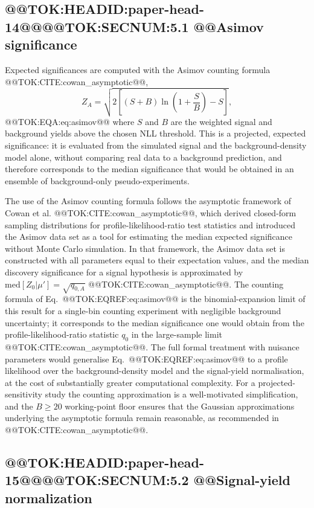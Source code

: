 \documentclass[11pt]{article}
\begin{document}
\subsection{@@TOK:HEADID:paper-head-14@@@@TOK:SECNUM:5.1 @@Asimov significance}

Expected significances are computed with the Asimov counting formula
@@TOK:CITE:cowan_asymptotic@@,
\begin{equation}
  Z_A = \sqrt{2\left[(S+B)\ln\left(1+\frac{S}{B}\right)-S\right]},
  
\end{equation}@@TOK:EQA:eq:asimov@@
where $S$ and $B$ are the weighted signal and background yields above the
chosen NLL threshold. This is a projected, expected significance: it is
evaluated from the simulated signal and the background-density model alone,
without comparing real data to a background prediction, and therefore
corresponds to the median significance that would be obtained in an
ensemble of background-only pseudo-experiments.

The use of the Asimov counting formula follows the asymptotic framework of
Cowan et al. @@TOK:CITE:cowan_asymptotic@@, which derived closed-form sampling
distributions for profile-likelihood-ratio test statistics and introduced
the Asimov data set as a tool for estimating the median expected
significance without Monte Carlo simulation. In that framework, the Asimov
data set is constructed with all parameters equal to their expectation
values, and the median discovery significance for a signal hypothesis is
approximated by $\mathrm{med}[Z_0|\mu'] = \sqrt{q_{0,A}}$
@@TOK:CITE:cowan_asymptotic@@. The counting formula of Eq.~@@TOK:EQREF:eq:asimov@@ is
the binomial-expansion limit of this result for a single-bin counting
experiment with negligible background uncertainty; it corresponds to the
median significance one would obtain from the profile-likelihood-ratio
statistic $q_0$ in the large-sample limit @@TOK:CITE:cowan_asymptotic@@. The
full formal treatment with nuisance parameters would generalise
Eq.~@@TOK:EQREF:eq:asimov@@ to a profile likelihood over the background-density
model and the signal-yield normalisation, at the cost of substantially
greater computational complexity. For a projected-sensitivity study the
counting approximation is a well-motivated simplification, and the
$B\geq20$ working-point floor ensures that the Gaussian approximations
underlying the asymptotic formula remain reasonable, as recommended in
@@TOK:CITE:cowan_asymptotic@@.

\subsection{@@TOK:HEADID:paper-head-15@@@@TOK:SECNUM:5.2 @@Signal-yield normalization}
\end{document}
